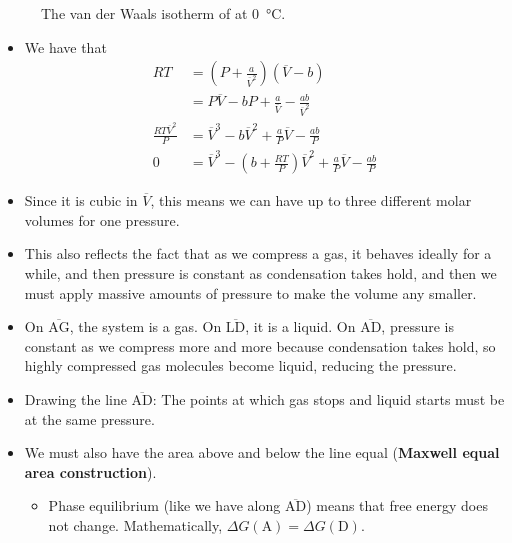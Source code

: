 \documentclass[../notes.tex]{subfiles}
\begin{document}
\begin{itemize}
\begin{figure}[h!]
        \caption{The van der Waals isotherm of  at \SI{0}{\celsius}.}
        \label{fig:vanDerWaalsIsotherm}
    \end{figure}
    \begin{itemize}
        \item We have that
        \begin{align*}
            RT &= \left( P+\frac{a}{\overline{V}^2} \right)(\overline{V}-b)\\
            &= P\overline{V}-bP+\frac{a}{\overline{V}}-\frac{ab}{\overline{V}^2}\\
            \frac{RT\overline{V}^2}{P} &= \overline{V}^3-b\overline{V}^2+\frac{a}{P}\overline{V}-\frac{ab}{P}\\
            0 &= \overline{V}^3-\left( b+\frac{RT}{P} \right)\overline{V}^2+\frac{a}{P}\overline{V}-\frac{ab}{P}
        \end{align*}
        \item Since it is cubic in $\overline{V}$, this means we can have up to three different molar volumes for one pressure.
        \item This also reflects the fact that as we compress a gas, it behaves ideally for a while, and then pressure is constant as condensation takes hold, and then we must apply massive amounts of pressure to make the volume any smaller.
        \item On $\overline{\text{AG}}$, the system is a gas. On $\overline{\text{LD}}$, it is a liquid. On $\overline{\text{AD}}$, pressure is constant as we compress more and more because condensation takes hold, so highly compressed gas molecules become liquid, reducing the pressure.
        \item Drawing the line $\overline{\text{AD}}$: The points at which gas stops and liquid starts must be at the same pressure.
        \item We must also have the area above and below the line equal (\textbf{Maxwell equal area construction}).
        \begin{itemize}
            \item Phase equilibrium (like we have along $\overline{\text{AD}}$) means that free energy does not change. Mathematically, $\Delta G(\text{A})=\Delta G(\text{D})$.

\end{itemize}
\end{itemize}
\end{itemize}
\end{document}
